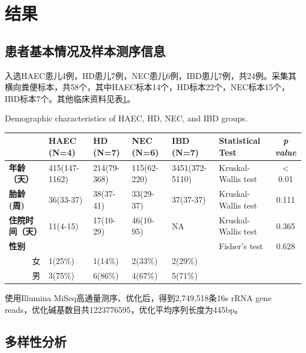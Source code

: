 \section{结果}
  \subsection{患者基本情况及样本测序信息}
  入选HAEC患儿4例，HD患儿7例，NEC患儿6例，IBD患儿7例，共24例。采集其横向粪便标本，共58个，其中HAEC标本14个，HD标本22个，NEC标本15个，IBD标本7个。其他临床资料见表\ref{tab:comparedemographic}。

  \begin{table}[!hpb]
    \centering
      {Demographic characteristics of HAEC, HD, NEC, and IBD groups.}
    \label{tab:comparedemographic}
    \begin{tabular}{lp{1.8cm}p{1.6cm}p{1.8cm}p{1.8cm}p{2cm}c}
      \toprule
         & \textbf{HAEC (N=4)} & \textbf{HD (N=7)} & \textbf{NEC (N=6)} & \textbf{IBD (N=7)} & \textbf{Statistical Test} & \textit{p value} \\ \midrule
        \textbf{年龄（天）} & 415(147-1162) & 214(79-368) & 115(62-220) & 3451(372-5110) & Kruskal-Wallis test & < 0.01 \\
        \textbf{胎龄(周)} & 36(33-37) & 38(37-41) & 33(29-37) & 37(37-37) & Kruskal-Wallis test & 0.111 \\
        \textbf{住院时间（天）} & 11(4-15) & 17(10-29) & 46(10-95) & NA & Kruskal-Wallis test & 0.365 \\
        \textbf{性别} &  &  &  & & Fisher's test & 0.628 \\
        \multicolumn{1}{r}{女} & 1(25\%) & 1(14\%) & 2(33\%) & 2(29\%) &  & \\
        \multicolumn{1}{r}{男} & 3(75\%) & 6(86\%) & 4(67\%) & 5(71\%) &  &\\
         \bottomrule
    \end{tabular}
  \end{table}

  使用Illumina MiSeq高通量测序、优化后，得到2,749,518条16s rRNA gene reads，优化碱基数目共1223776595，优化平均序列长度为445bp。

  \subsection{多样性分析}
